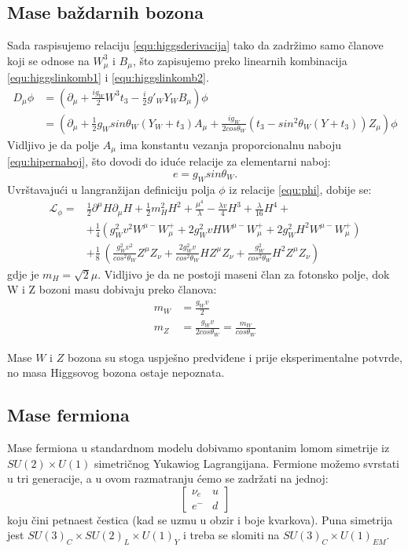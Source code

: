 \documentclass[a4paper,12pt]{report}
\begin{document}
\subsection{Mase baždarnih bozona}
Sada raspisujemo relaciju \ref{equ:higgsderivacija} tako da zadržimo samo članove koji se odnose na $W_{\mu}^3$ i $B_{\mu}$, što zapisujemo preko linearnih kombinacija \ref{equ:higgslinkomb1} i \ref{equ:higgslinkomb2}.
\begin{align}
 D_{\mu} \phi &= \left(\partial_{\mu}+\frac{i g_W}{2} W^3t_3-\frac{i}{2} g'_W Y_WB_{\mu} \right) \phi \nonumber \\  &= \left( \partial_{\mu} + \frac{1}{2} g_W sin\theta_W (Y_W+t_3)A_{\mu} + \frac{i g_W}{2 cos\theta_W} \left(t_3-sin^2 \theta_W(Y+t_3)\right) Z_{\mu}\right) \phi
\label{equ:fotoniz}
\end{align}
Vidljivo je da polje $A_{\mu}$ ima konstantu vezanja proporcionalnu naboju \ref{equ:hipernaboj}, što dovodi do iduće relacije za elementarni naboj:
\begin{equation}
 e=g_W sin\theta_W.
\end{equation}
Uvrštavajući u langranžijan definiciju polja $\phi$ iz relacije \ref{equ:phi}, dobije se:
\begin{align}
 \mathcal{L}_{\phi}=&\frac{1}{2} \partial^{\mu}H \partial_{\mu}H + \frac{1}{2}m_H^2 H^2 + \frac{\mu^4}{\lambda}-\frac{\lambda v}{4}H^3 + \frac{\lambda}{16}H^4+ \nonumber \\
 & + \frac{1}{4} \left(g_W^2 v^2 W^{\mu-}W_{\mu}^+ + 2g_W^2vHW^{\mu-}W_{\mu}^+ +2g_W^2H^2W^{\mu-}W_{\mu}^+ \right)\nonumber \\
& + \frac{1}{8} \ \left( \frac{g_W^2v^2}{cos^2\theta_W} Z^{\mu}Z_{\nu}+\frac{2g_W^2v}{cos^2\theta_W} HZ^{\mu}Z_{\nu} +\frac{g_W^2}{cos^2\theta_W} H^2 Z^{\mu}Z_{\nu} \right)
\end{align} 
gdje je $m_H=\sqrt{2}\mu$. Vidljivo je da ne postoji maseni član za fotonsko polje, dok W i Z bozoni masu dobivaju preko članova:
\begin{align}
 m_W &= \frac{g_Wv}{2} \\
 m_Z &= \frac{g_Wv}{2cos\theta_W}=\frac{m_W}{cos\theta_W}
\end{align}


Mase $W$ i $Z$ bozona su stoga uspješno predviđene i prije eksperimentalne potvrde, no masa Higgsovog bozona ostaje nepoznata.
\subsection{Mase fermiona}
Mase fermiona u standardnom modelu dobivamo spontanim lomom simetrije iz $SU(2)\times U(1)$ simetričnog Yukawiog Lagrangijana. Fermione možemo svrstati u tri generacije, a u ovom razmatranju ćemo se zadržati na jednoj: 
\begin{equation}
 \left[\begin{array}{cc}\nu_{e}&u\\e^{-}&d\end{array}\right]
\end{equation}
koju čini petnaest čestica (kad se uzmu u obzir i boje kvarkova). Puna simetrija jest $SU(3)_{C}\times SU(2)_{L}\times U(1)_{Y}$ i treba se slomiti na $SU(3)_{C}\times U(1)_{EM}$.
\end{document}
